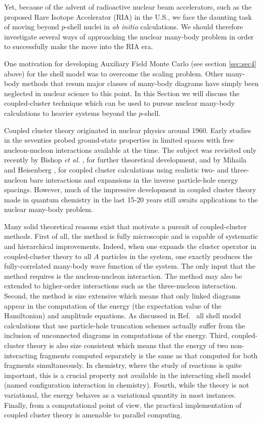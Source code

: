 \documentclass{article}
\begin{document}
Yet, because of the advent of radioactive nuclear beam
accelerators, such as the proposed Rare Isotope Accelerator (RIA) in the
U.S., we face the daunting task of moving beyond
$p$-shell nuclei in {\em ab initio} calculations. We should therefore
investigate several ways of approaching the nuclear many-body 
problem in order to successfully make the move into the RIA era.

One motivation for developing 
Auxiliary Field Monte Carlo (see section \ref{sec:sec4} above) for the shell model was 
to overcome the scaling problem. Other many-body 
methods that resum major classes of many-body diagrams have simply
been neglected in nuclear science to this point. 
In this Section we will discuss the coupled-cluster 
technique which can be used to pursue nuclear many-body calculations to 
heavier systems beyond the $p$-shell. 

Coupled cluster theory originated in nuclear physics
\cite{coester58,coester60} around 1960.  Early studies in the
seventies \cite{klz78} probed ground-state properties in limited
spaces with free nucleon-nucleon interactions available at the
time. The subject was revisited
only recently by Bishop {\it et al.}
\cite{ticcm}, for further theoretical development, and by Mihaila and
Heisenberg \cite{hm99}, for coupled cluster calculations
using realistic
two- and three-nucleon
bare interactions
and expansions in the
inverse particle-hole energy spacings.
However, much of
the impressive development in
coupled cluster theory made in quantum chemistry in
the last 15-20 years
\cite{comp_chem_rev00,Bartlett95,Paldus99,Piecuch02a,Piecuch02b}
still awaits applications to the nuclear many-body problem.

Many solid theoretical reasons exist that motivate a pursuit of
coupled-cluster methods. First of all, the method is fully
microscopic and is capable of systematic and hierarchical improvements.
Indeed, when one expands the cluster operator in coupled-cluster theory
to all $A$ particles in the system, one exactly produces the fully-correlated
many-body wave function of the system. The only input that the method
requires is the nucleon-nucleon interaction. 
The method may also be extended
to higher-order interactions such as the three-nucleon interaction.
Second, the method is size extensive which means that only linked
diagrams appear in the computation of the  
energy (the expectation value of the Hamiltonian) and amplitude equations.
As discussed in Ref.~\cite{comp_chem_rev00} all shell model calculations
that use particle-hole truncation schemes
actually suffer from the inclusion of unconnected diagrams
in computations of the energy.
Third, coupled-cluster theory is also size
consistent which means that the energy of two non-interacting fragments
computed separately is the same as that computed for both fragments
simultaneously. In chemistry, where the study of reactions
is quite important, this is a crucial property not available
in the interacting shell model (named configuration interaction in
chemistry).
Fourth, while the theory
is not variational,
the energy behaves as a variational quantity in most instances.
Finally, from a
computational point of view, the practical implementation of coupled
cluster theory is amenable to parallel computing.
\end{document}
